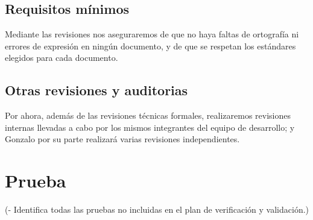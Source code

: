 \documentclass[spanish,a4paper,11pt, twoside]{report}	%
\begin{document}
	\section{Requisitos mínimos}
	Mediante las revisiones nos aseguraremos de que no haya faltas de ortografía ni errores de expresión en ningún documento, y de que se respetan los estándares elegidos para cada documento.
	\section{Otras revisiones y auditorias}
	Por ahora, además de las revisiones técnicas formales, realizaremos revisiones internas llevadas a cabo por los mismos integrantes del  equipo de desarrollo;  y Gonzalo por su parte realizará varias revisiones independientes.

\newpage
\mbox{}
\thispagestyle{empty}						%
\newpage

\chapter{ Prueba}%
	(- Identifica todas las pruebas no incluidas en el plan
	de verificación y validación.)

\newpage
\mbox{}
\thispagestyle{empty}						%
\newpage
\end{document}
